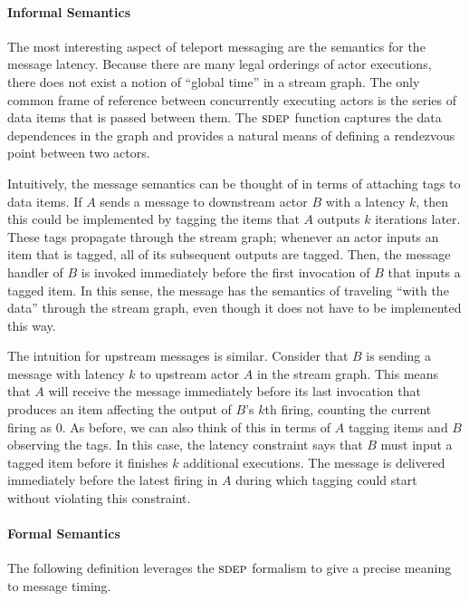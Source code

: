 \paragraph*{Informal Semantics} The most interesting aspect of teleport
messaging are the semantics for the message latency.  Because there
are many legal orderings of actor executions, there does not exist a
notion of ``global time'' in a stream graph.  The only common frame of
reference between concurrently executing actors is the series of data
items that is passed between them.  The $\textsc{sdep}$ function captures the
data dependences in the graph and provides a natural means of defining
a rendezvous point between two actors.

Intuitively, the message semantics can be thought of in terms of
attaching tags to data items.  If $A$ sends a message to downstream
actor $B$ with a latency $k$, then this could be implemented by
tagging the items that $A$ outputs $k$ iterations later.  These tags
propagate through the stream graph; whenever an actor inputs an item
that is tagged, all of its subsequent outputs are tagged.  Then, the
message handler of $B$ is invoked immediately before the first
invocation of $B$ that inputs a tagged item.  In this sense, the
message has the semantics of traveling ``with the data'' through the
stream graph, even though it does not have to be implemented this way.

The intuition for upstream messages is similar.  Consider that $B$ is
sending a message with latency $k$ to upstream actor $A$ in the stream
graph.  This means that $A$ will receive the message immediately
before its last invocation that produces an item affecting the output
of $B$'s $k$th firing, counting the current firing as 0.  As before,
we can also think of this in terms of $A$ tagging items and $B$
observing the tags.  In this case, the latency constraint says that
$B$ must input a tagged item before it finishes $k$ additional
executions.  The message is delivered immediately before the latest
firing in $A$ during which tagging could start without violating this
constraint.

\paragraph*{Formal Semantics} The following definition leverages the
$\textsc{sdep}$ formalism to give a precise meaning to message timing.

